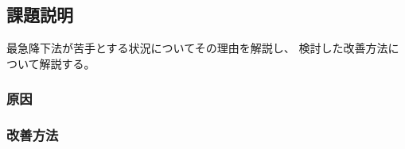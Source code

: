 \subsection{課題説明}
最急降下法が苦手とする状況についてその理由を解説し、
検討した改善方法について解説する。

\subsubsection{原因}

\subsubsection{改善方法}

